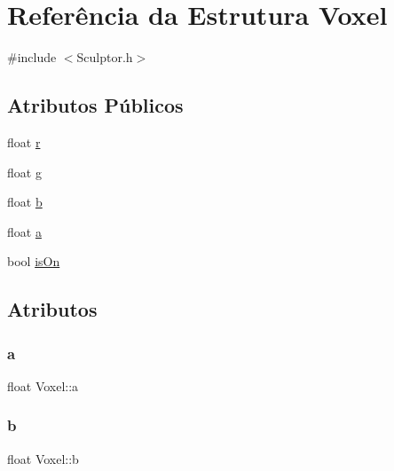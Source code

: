 \hypertarget{structVoxel}{}\section{Referência da Estrutura Voxel}
\label{structVoxel}


{\ttfamily \#include $<$Sculptor.\+h$>$}

\subsection*{Atributos Públicos}
\begin{DoxyCompactItemize}
\item 
float \hyperlink{structVoxel_a06872ec79b836120b551a848968c0f1b}{r}
\item 
float \hyperlink{structVoxel_a27c0da1ed2ff430401d23ff171612a73}{g}
\item 
float \hyperlink{structVoxel_a5cd8432b1d7d0fd8b79e0fc7d10373a8}{b}
\item 
float \hyperlink{structVoxel_a3ce2579eb0a9f09a07112ce7498a638e}{a}
\item 
bool \hyperlink{structVoxel_a6fbe8bd53f64685ac4210726d40fc775}{is\+On}
\end{DoxyCompactItemize}


\subsection{Atributos}
\mbox{\label{structVoxel_a3ce2579eb0a9f09a07112ce7498a638e}} 
\subsubsection{\texorpdfstring{a}{a}}
{\footnotesize\ttfamily float Voxel\+::a}

\mbox{\label{structVoxel_a5cd8432b1d7d0fd8b79e0fc7d10373a8}} 
\subsubsection{\texorpdfstring{b}{b}}
{\footnotesize\ttfamily float Voxel\+::b}

\mbox{\label{structVoxel_a27c0da1ed2ff430401d23ff171612a73}} 
